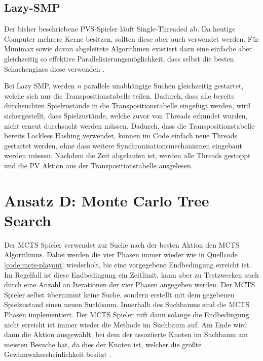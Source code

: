 \pagebreak

\subsection{Lazy-SMP}

Der bisher beschriebene \ac{PVS}-Spieler läuft Single-Threaded ab. Da heutige Computer mehrere Kerne besitzen, sollten diese aber auch verwendet werden. Für Mimimax sowie davon abgeleitete Algorithmen existiert dazu eine einfache aber gleichzeitig so effektive Parallelisierungsmöglichkeit, dass selbst die besten Schachengines diese verwenden \cite{2016.Stockfish7} \cite[S. 52]{2016.ParallelChessEngine}.

Bei Lazy \ac{SMP}, werden $n$ parallele unabhängige Suchen gleichzeitig gestartet, welche sich nur die Transpositionstabelle teilen. Dadurch, dass alle bereits durchsuchten Spielzustände in die Transpositionstabelle eingefügt werden, wird sichergestellt, dass Spielzustände, welche zuvor von Threads erkundet wurden, nicht erneut durchsucht werden müssen. Dadurch, dass die Transpositionstabelle bereits Lockless Hashing verwendet, können im Code einfach neue Threads gestartet werden, ohne dass weitere Synchronisationsmechanismen eingebaut werden müssen. Nachdem die Zeit abgelaufen ist, werden alle Threads gestoppt und die \ac{PV} Aktion aus der Transpositionstabelle ausgelesen.

\pagebreak

\section{Ansatz D: Monte Carlo Tree Search}
\label{section:erstellung-ansatz-c}

Der \ac{MCTS} Spieler verwendet zur Suche nach der besten Aktion den \acl{MCTS} Algorithmus. Dabei werden die vier Phasen immer wieder wie in Quellcode \ref{code:mcts-playout} wiederholt, bis eine vorgegebene Endbedingung erreicht ist. Im Regelfall ist diese Endbedingung ein Zeitlimit, kann aber zu Testzwecken auch durch eine Anzahl an Iterationen der vier Phasen angegeben werden. Der \ac{MCTS} Spieler selbst übernimmt keine Suche, sondern erstellt mit dem gegebenen Spielzustand einen neuen Suchbaum. Innerhalb des Suchbaums sind die \ac{MCTS} Phasen implementiert. Der \ac{MCTS} Spieler ruft dann solange die Endbedingung nicht erreicht ist immer wieder die  Methode im Suchbaum auf. Am Ende wird dann die Aktion ausgewählt, bei dem der assoziierte Knoten im Suchbaum am meisten Besuche hat, da dies der Knoten ist, welcher die größte Gewinnwahrscheinlichkeit besitzt \cite[S. 217]{2008.MCTS}.

